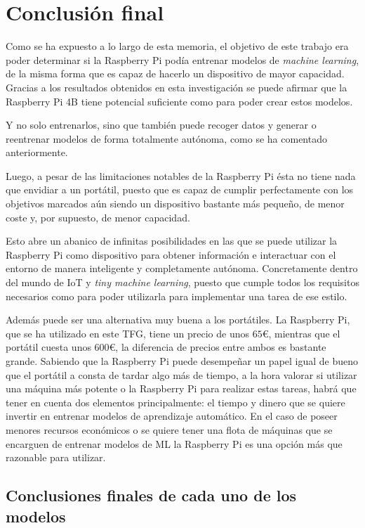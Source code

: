 \documentclass[a4paper, 12pt]{book}
\begin{document}
\section{Conclusión final}
\label{sec:conclusion_final}

Como se ha expuesto a lo largo de esta memoria, el objetivo de este trabajo era poder determinar si la Raspberry Pi podía entrenar modelos de \textit{machine learning}, de la misma forma que es capaz de hacerlo un dispositivo de mayor capacidad. Gracias a los resultados obtenidos en esta investigación se puede afirmar que la Raspberry Pi 4B tiene potencial suficiente como para poder crear estos modelos.

Y no solo entrenarlos, sino que también puede recoger datos y generar o reentrenar modelos de forma totalmente autónoma, como se ha comentado anteriormente. 

Luego, a pesar de las limitaciones notables de la Raspberry Pi ésta no tiene nada que envidiar a un portátil, puesto que es capaz de cumplir perfectamente con los objetivos marcados aún siendo un dispositivo bastante más pequeño, de menor coste y, por supuesto, de menor capacidad.

Esto abre un abanico de infinitas posibilidades en las que se puede utilizar la Raspberry Pi como dispositivo para obtener información e interactuar con el entorno de manera inteligente y completamente autónoma. Concretamente dentro del mundo de IoT y \textit{tiny machine learning}, puesto que cumple todos los requisitos necesarios como para poder utilizarla para implementar una tarea de ese estilo.

Además puede ser una alternativa muy buena a los portátiles. La Raspberry Pi, que se ha utilizado en este TFG, tiene un precio de unos $65$\euro, mientras que el portátil cuesta unos $600$\euro, la diferencia de precios entre ambos es bastante grande. Sabiendo que la Raspberry Pi puede desempeñar un papel igual de bueno que el portátil a consta de tardar algo más de tiempo, a la hora valorar si utilizar una máquina más potente o la Raspberry Pi para realizar estas tareas, habrá que tener en cuenta dos elementos principalmente: el tiempo y dinero que se quiere invertir en entrenar modelos de aprendizaje automático. En el caso de poseer menores recursos económicos o se quiere tener una flota de máquinas que se encarguen de entrenar modelos de ML la Raspberry Pi es una opción más que razonable para utilizar.

\subsection{Conclusiones finales de cada uno de los modelos}
\end{document}
